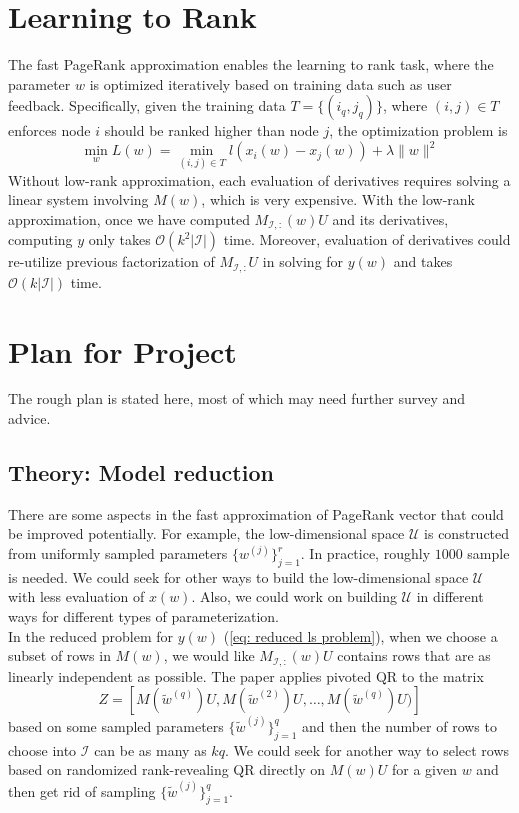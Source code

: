 \documentclass[a4paper, 11pt]{article}
\begin{document}
\section{Learning to Rank}
The fast PageRank approximation enables the learning to rank task, where the parameter $w$ is optimized iteratively based on training data such as user feedback. Specifically, given the training data $T=\{(i_q, j_q)\}$, where $(i, j) \in T$ enforces node $i$ should be ranked higher than node $j$, the optimization problem is 
\begin{equation}
	\min_{w} L(w) = \min_{(i, j) \in T} l(x_i(w) - x_j(w)) + \lambda\|w\|^2
\end{equation}
Without low-rank approximation, each evaluation of derivatives requires solving a linear system involving $M(w)$, which is very expensive. With the low-rank approximation, once we have computed $M_{\mathcal{I},:}(w)U$ and its derivatives, computing $y$ only takes $\mathcal{O}(k^2 |\mathcal{I}|)$ time. Moreover, evaluation of derivatives could re-utilize previous factorization of $M_{\mathcal{I},:}U$ in solving for $y(w)$ and takes $\mathcal{O}(k|\mathcal{I}|)$ time. \\ 



\section{Plan for Project}
The rough plan is stated here, most of which may need further survey and advice. 
\subsection{Theory: Model reduction}
	There are some aspects in the fast approximation of PageRank vector that could be improved potentially. For example, the low-dimensional space $\mathcal{U}$ is constructed from uniformly sampled parameters $\{w^{(j)}\}_{j=1}^r$. In practice, roughly $1000$ sample is needed. We could seek for other ways to build the low-dimensional space $\mathcal{U}$ with less evaluation of $x(w)$. Also, we could work on building $\mathcal{U}$ in different ways for different types of parameterization. \\
	
	In the reduced problem for $y(w)$ (\ref{eq: reduced ls problem}), when we choose a subset of rows in $M(w)$, we would like $M_{\mathcal{I},:}(w)U$ contains rows that are as linearly independent as possible. The paper applies pivoted QR to the matrix $$Z = [M(\tilde{w}^{(q)})U, M(\tilde{w}^{(2)})U, \dots, M(\tilde{w}^{(q)})U)]$$ based on some sampled parameters $\{\tilde{w}^{(j)}\}_{j=1}^q$ and then the number of rows to choose into $\mathcal{I}$ can be as many as $kq$. We could seek for another way to select rows based on randomized rank-revealing QR directly on $M(w)U$ for a given $w$ and then get rid of sampling $\{\tilde{w}^{(j)}\}_{j=1}^q$. 
\end{document}
